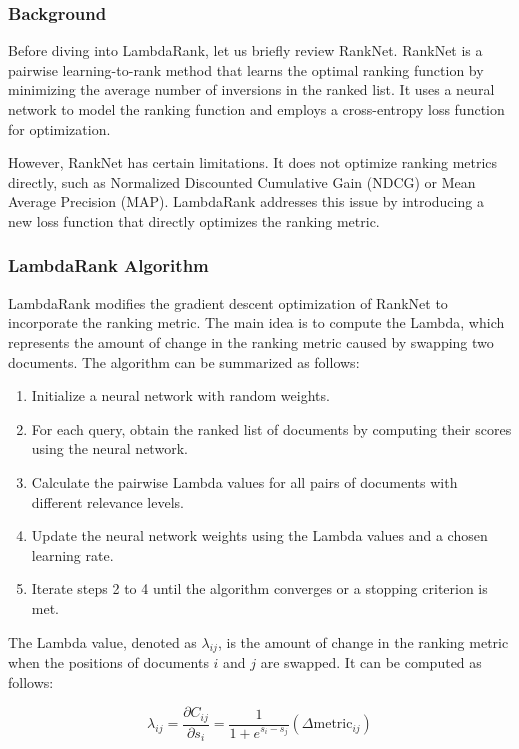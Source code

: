 \documentclass[12pt]{article}
\begin{document}
\subsubsection{Background}

Before diving into LambdaRank, let us briefly review RankNet. RankNet is a pairwise learning-to-rank method that learns the optimal ranking function by minimizing the average number of inversions in the ranked list. It uses a neural network to model the ranking function and employs a cross-entropy loss function for optimization.

However, RankNet has certain limitations. It does not optimize ranking metrics directly, such as Normalized Discounted Cumulative Gain (NDCG) or Mean Average Precision (MAP). LambdaRank addresses this issue by introducing a new loss function that directly optimizes the ranking metric.

\subsubsection{LambdaRank Algorithm}

LambdaRank modifies the gradient descent optimization of RankNet to incorporate the ranking metric. The main idea is to compute the Lambda, which represents the amount of change in the ranking metric caused by swapping two documents. The algorithm can be summarized as follows:

\begin{enumerate}
\item Initialize a neural network with random weights.
\item For each query, obtain the ranked list of documents by computing their scores using the neural network.
\item Calculate the pairwise Lambda values for all pairs of documents with different relevance levels.
\item Update the neural network weights using the Lambda values and a chosen learning rate.
\item Iterate steps 2 to 4 until the algorithm converges or a stopping criterion is met.
\end{enumerate}

The Lambda value, denoted as $\lambda_{ij}$, is the amount of change in the ranking metric when the positions of documents $i$ and $j$ are swapped. It can be computed as follows:

\begin{equation}
\lambda_{ij} = \frac{\partial C_{ij}}{\partial s_i} = \frac{1}{1 + e^{s_i - s_j}} (\Delta \text{metric}_{ij})
\end{equation}
\end{document}

